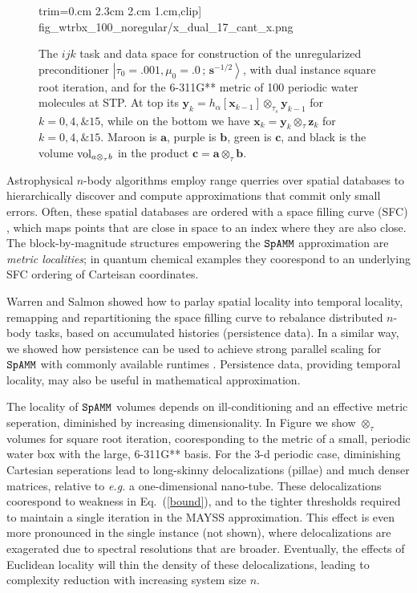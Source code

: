 \documentclass[letterpaper,twocolumn,amsmath,amsfont,amssymb,english,aps,jcp,preprintnumbers,groupaddress,nofootinbib,tightenlines,floatfix]{revtex4}
\newcommand{\mat}[1]{\boldsymbol{#1}}
\newcommand{\ot}{  {\scriptstyle \otimes}_{ \tau } }
\newcommand{\ots}{ {\scriptstyle \otimes}_{ \! \tau_s } }
\theoremstyle{plain}
\theoremstyle{remark}
\theoremstyle{plain}
\begin{document}
\begin{figure}[h]
{                        trim={0.cm 2.3cm 2.cm 1.cm},clip]
                        {fig_wtrbx_100_noregular/x_dual_17_cant_x.png}} 
\caption{
The $ijk$ task and data space for construction of the unregularized preconditioner 
$\left|\tau_0=.001,\mu_0=.0\, ; \,\scriptstyle{\mat{s}^{-1/2}} \right>$, with
dual instance square root iteration, and for the 6-311G** metric of 100 periodic water molecules
at STP.  At top its  $\mat{y}_k=h_\alpha[ \mat{x}_{k-1} ] \ots \mat{y}_{k-1}$
for $k=0,4,\& 15$, while on the bottom we have $\mat{x}_k=  \mat{y}_{k}  \ot \mat{z}_{k}$ for $k=0,4, \& 15$.
Maroon is $\mat{a}$, purple is $\mat{b}$, green is $\mat{c}$,  and black is the volume ${\rm vol}_{a \ot b}$
in the product $\mat{c}=\mat{a} \ot \mat{b}$.}\label{Lensing3}
\end{figure}

Astrophysical $n$-body algorithms employ range querries over spatial databases to hierarchically discover 
and compute approximations that commit only small errors.  Often, these spatial databases are ordered with a 
space filling curve (SFC) \cite{}, which maps points that are close in space to an index where they are also close. 
The block-by-magnitude structures empowering the $\tt SpAMM$ approximation are {\em metric localities}; 
in quantum chemical examples they coorespond to an underlying SFC ordering of Carteisan coordinates. 

Warren and Salmon showed how to parlay spatial locality into temporal locality, 
remapping and repartitioning the space filling curve to rebalance distributed $n$-body tasks,
based on accumulated histories (persistence data).
In a similar way, we showed how persistence can be used to achieve 
strong parallel scaling for $\tt SpAMM$ with commonly available runtimes \cite{}.  
Persistence data, providing temporal locality, may also be useful in mathematical approximation.  

The locality of $\tt SpAMM$ volumes depends on ill-conditioning and an effective metric seperation, diminished by 
increasing dimensionality.   In Figure  we show $\ot$ volumes for square root iteration, cooresponding to the metric of a small, periodic water box 
with the large, 6-311G** basis.  For the 3-d periodic case, diminishing Cartesian seperations lead to long-skinny delocalizations (pillae)
and much denser matrices, relative to {\em e.g.} a one-dimensional nano-tube.  These delocalizations coorespond to weakness in Eq.~(\ref{bound}),  
and to the tighter thresholds required to maintain a single iteration in the MAYSS approximation.  This effect is even more pronounced in the 
single instance (not shown), where delocalizations are exagerated due to spectral resolutions that are broader.  
Eventually, the effects of Euclidean locality will thin the density of these delocalizations, leading to complexity reduction with increasing
system size $n$.  
\end{document}
